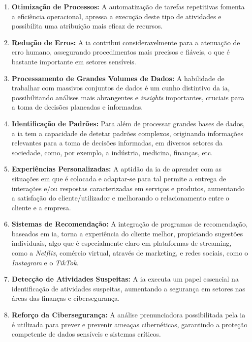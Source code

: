 \documentclass{report}
\begin{document}
\begin{enumerate}
	\item \textbf{Otimização de Processos:} A automatização de tarefas repetitivas fomenta a eficiência operacional, apressa a execução deste tipo de atividades e possibilita uma atribuição mais eficaz de recursos.

	\item \textbf{Redução de Erros:} A \ac{ia} contribui consideravelmente para a atenuação de erro humano, assegurando procedimentos mais precisos e fiáveis, o que é bastante importante em setores sensíveis.

	\item \textbf{Processamento de Grandes Volumes de Dados:} A habilidade de trabalhar com massivos conjuntos de dados é um cunho distintivo da \ac{ia}, possibilitando análises mais abrangentes e \textit{insights} importantes, cruciais para a toma de decisões planeadas e informadas.

	\item \textbf{Identificação de Padrões:} Para além de processar grandes bases de dados, a \ac{ia} tem a capacidade de detetar padrões complexos, originando informações relevantes para a toma de decisões informadas, em diversos setores da sociedade, como, por exemplo, a indústria, medicina, finanças, etc.

	\item \textbf{Experiências Personalizadas:} A aptidão da \ac{ia} de aprender com as situações em que é colocada e adaptar-se para tal permite a entrega de interações e/ou respostas caracterizadas em serviços e produtos, aumentando a satisfação do cliente/utilizador e melhorando o relacionamento entre o cliente e a empresa.

	\item \textbf{Sistemas de Recomendação:} A integração de programas de recomendação, baseados em \ac{ia}, torna a experiência do cliente melhor, propiciando sugestões individuais, algo que é especialmente claro em plataformas de streaming, como a \textit{Netflix}, comércio virtual, através de marketing, e redes sociais, como o \textit{Instagram} e o \textit{TikTok}.

	\item \textbf{Detecção de Atividades Suspeitas:} A \ac{ia} executa um papel essencial na identificação de atividades suspeitas, aumentando a segurança em setores nas áreas das finanças e cibersegurança.

	\item \textbf{Reforço da Cibersegurança:} A análise prenunciadora possibilitada pela \ac{ia} é utilizada para prever e prevenir ameaças cibernéticas, garantindo a proteção competente de dados sensíveis e sistemas críticos.


\end{enumerate}
\end{document}
